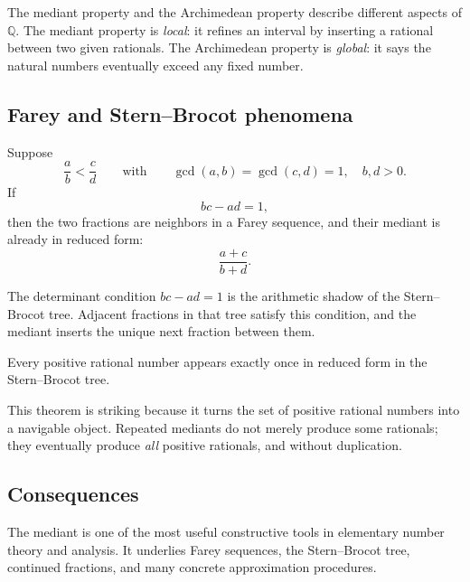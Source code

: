 \begin{remark}
\label{rem:mediant-vs-arch}
The mediant property and the Archimedean property describe different aspects of $\mathbb{Q}$.  The
mediant property is \emph{local}: it refines an interval by inserting a rational between two given
rationals.  The Archimedean property is \emph{global}: it says the natural numbers eventually exceed
any fixed number.
\end{remark}

\subsection{Farey and Stern--Brocot phenomena}

\begin{theorem}
\label{thm:farey-neighbor}
Suppose
\[
\frac{a}{b}<\frac{c}{d}
\qquad\text{with}\qquad
\gcd(a,b)=\gcd(c,d)=1,
\quad b,d>0.
\]
If
\[
bc-ad=1,
\]
then the two fractions are neighbors in a Farey sequence, and their mediant is already in reduced
form:
\[
\frac{a+c}{b+d}.
\]
\end{theorem}

\begin{remark}
The determinant condition $bc-ad=1$ is the arithmetic shadow of the Stern--Brocot tree.  Adjacent
fractions in that tree satisfy this condition, and the mediant inserts the unique next fraction between
them.
\end{remark}

\begin{theorem}
\label{thm:stern-brocot-enumeration}
Every positive rational number appears exactly once in reduced form in the Stern--Brocot tree.
\end{theorem}

\begin{remark}
This theorem is striking because it turns the set of positive rational numbers into a navigable object.
Repeated mediants do not merely produce some rationals; they eventually produce \emph{all} positive
rationals, and without duplication.
\end{remark}

\subsection{Consequences}

\begin{remark}
The mediant is one of the most useful constructive tools in elementary number theory and analysis.
It underlies Farey sequences, the Stern--Brocot tree, continued fractions, and many concrete
approximation procedures.
\end{remark}



